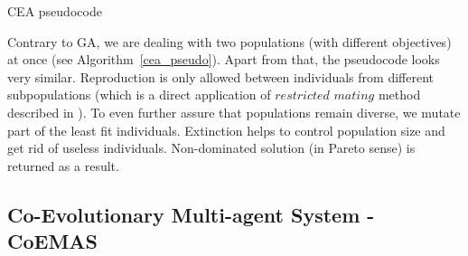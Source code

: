 \begin{algorithm}
 
  \BlankLine
  \initialise{\riskOrientedSubpopulation} \;
  \initialise{\returnOrientedSubpopulation} \;
  
  \caption{CEA pseudocode}\label{cea_pseudo}
\end{algorithm}

Contrary to GA, we are dealing with two populations (with different objectives) at once (see Algorithm~\ref{cea_pseudo}).
Apart from that, the pseudocode looks very similar.
Reproduction is only allowed between individuals from different subpopulations (which is a direct application of $restricted$ $mating$ method
 described in \cite{zitz1999a}).
To even further assure that populations remain diverse, we mutate part of the least fit individuals.
Extinction helps to control population size and get rid of useless individuals.
Non-dominated solution (in Pareto sense) is returned as a result.



\subsection{Co-Evolutionary Multi-agent System - CoEMAS}

